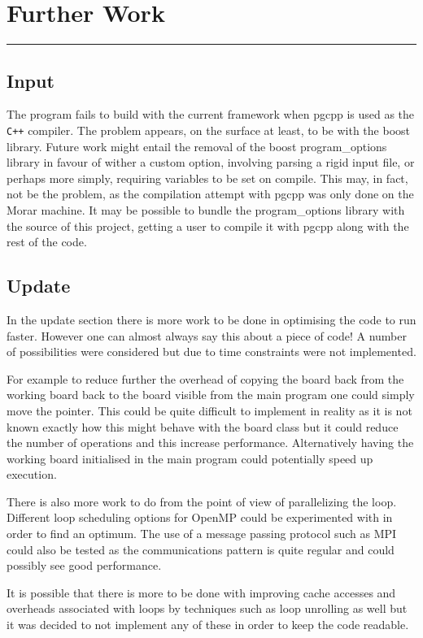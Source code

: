 \section{Further Work}
\vspace{-2em}\rule{\textwidth}{1pt}\vspace{-1em}
\subsection{Input}
  The program fails to build with the current framework when pgcpp is used
  as the \texttt{C++} compiler.
  The problem appears, on the surface at least, to be with the boost library.
  Future work might entail the removal of the boost program\_options library
  in favour of wither a custom option, involving parsing a rigid input file,
  or perhaps more simply, requiring variables to be set on compile.
  This may, in fact, not be the problem, as the compilation attempt with
  pgcpp was only done on the Morar machine.
  It may be possible to bundle the program\_options library with the
  source of this project, getting a user to compile it with pgcpp along
  with the rest of the code.
\subsection{Update}
  In the update section there is more work to be done in optimising the code to run faster.
  However one can almost always say this about a piece of code!
  A number of possibilities were considered but due to time constraints were not implemented.

  For example to reduce further the overhead of copying the board back from the working board back to the board visible from the main program one could simply move the pointer.
  This could be quite difficult to implement in reality as it is not known exactly how this might behave with the board class but it could reduce the number of operations and this increase performance.
  Alternatively having the working board initialised in the main program could potentially speed up execution.

  There is also more work to do from the point of view of parallelizing the loop.
  Different loop scheduling options for OpenMP could be experimented with in order to find an optimum.
  The use of a message passing protocol such as MPI could also be tested as the communications pattern is quite regular and could possibly see good performance.

  It is possible that there is more to be done with improving cache accesses and overheads associated with loops by techniques such as loop unrolling as well but it was decided to not implement any of these in order to keep the code readable.
